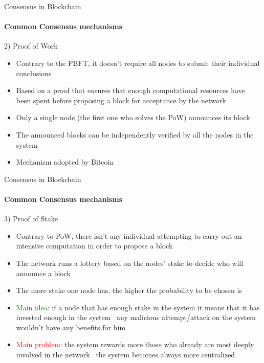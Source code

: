 \documentclass{beamer}
\newcommand\red[1]{\textcolor{red}{#1}}
\begin{document}
  \begin{frame}{Consensus in Blockchain}
    \framesubtitle{Common Consensus mechanisms}
    \begin{block}{2) Proof of Work}
      \begin{itemize}
        \item Contrary to the PBFT, it doesn’t require all nodes to submit
        their individual conclusions 
        \item Based on a proof that ensures that enough computational resources have
        been spent before proposing a block for acceptance by the network 
        \item Only a single node (the first one who solves the PoW) announces its
        block 
        \item The announced blocks can be independently verified by all
        the nodes in the system \pause
        \item Mechanism adopted by Bitcoin
      \end{itemize}
    \end{block}
  \end{frame}





  \begin{frame}{Consensus in Blockchain}
    \framesubtitle{Common Consensus mechanisms}
    \begin{block}{3) Proof of Stake}
      \begin{itemize}
        \item Contrary to PoW, there isn't any individual attempting to carry out
        an intensive computation in order to propose a block 
        \item The network runs a lottery based on the nodes’ stake to decide
        who will announce a block 
        \item The more stake one node has, the higher the probability
        to be chosen is 
        \item \textcolor{green}{Main idea}: if a node that has enough stake in the system it means
        that it has invested enough in the system \MVRightarrow\, any malicious
        attempt/attack on the system wouldn't have any benefits for him \pause
        \item \red{Main problem}: the system rewards more those who already are most
        deeply involved in the network \MVRightarrow\, the system becomes always
        more centralized
      \end{itemize}
    \end{block}
  \end{frame}
\end{document}
